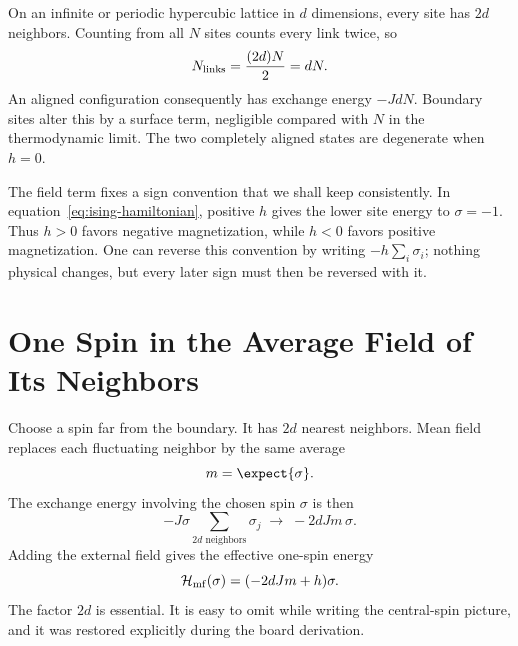 On an infinite or periodic hypercubic lattice in \(d\) dimensions, every site has \(2d\) neighbors. Counting from all \(N\) sites counts every link twice, so
\begin{equation}
N_{\rm links}=\frac{(2d)N}{2}=dN.
\label{eq:number-links}
\end{equation}
An aligned configuration consequently has exchange energy \(-JdN\). Boundary sites alter this by a surface term, negligible compared with \(N\) in the thermodynamic limit. The two completely aligned states are degenerate when \(h=0\).

The field term fixes a sign convention that we shall keep consistently. In equation~\eqref{eq:ising-hamiltonian}, positive \(h\) gives the lower site energy to \(\sigma=-1\). Thus \(h>0\) favors negative magnetization, while \(h<0\) favors positive magnetization. One can reverse this convention by writing \(-h\sum_i\sigma_i\); nothing physical changes, but every later sign must then be reversed with it.

\begin{classroomqa}
\end{classroomqa}

\section{One Spin in the Average Field of Its Neighbors}

Choose a spin far from the boundary. It has \(2d\) nearest neighbors. Mean field replaces each fluctuating neighbor by the same average
\begin{equation}
m=\expect{\sigma}.
\end{equation}
The exchange energy involving the chosen spin \(\sigma\) is then
\begin{equation}
-J\sigma\sum_{\text{\(2d\) neighbors}}\sigma_j
\;\longrightarrow\;-2dJm\,\sigma.
\end{equation}
Adding the external field gives the effective one-spin energy
\begin{equation}
\mathcal H_{\rm mf}(\sigma)=(-2dJm+h)\sigma.
\label{eq:mean-field-one-spin}
\end{equation}
The factor \(2d\) is essential. It is easy to omit while writing the central-spin picture, and it was restored explicitly during the board derivation.

